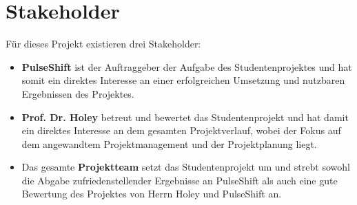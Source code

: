 \section{Stakeholder}
Für dieses Projekt existieren drei Stakeholder:
\begin{itemize}
\item \textbf{PulseShift} ist der Auftraggeber der Aufgabe des Studentenprojektes und hat somit ein direktes Interesse an einer erfolgreichen Umsetzung und nutzbaren Ergebnissen des Projektes.
\item \textbf{Prof. Dr. Holey} betreut und bewertet das Studentenprojekt und hat damit ein direktes Interesse an dem gesamten Projektverlauf, wobei der Fokus auf dem angewandtem Projektmanagement und der Projektplanung liegt.
\item Das gesamte \textbf{Projektteam} setzt das Studentenprojekt um und strebt sowohl die Abgabe zufriedenstellender Ergebnisse an PulseShift als auch eine gute Bewertung des Projektes von Herrn Holey und PulseShift an.
\end{itemize}
